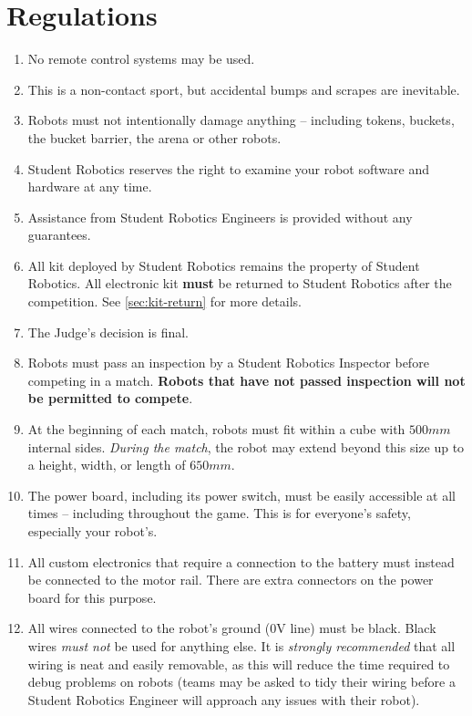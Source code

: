 \section {Regulations}
\label{sec:Regulations}

\begin{enumerate}


\item No remote control systems may be used.
\item This is a non-contact sport, but accidental bumps and scrapes are inevitable.
\item Robots must not intentionally damage anything -- including tokens, buckets, the bucket barrier, the arena or other robots.
\item Student Robotics reserves the right to examine your robot software and hardware at any time.
\item Assistance from Student Robotics Engineers is provided without any guarantees.
\item All kit deployed by Student Robotics remains the property of Student Robotics.
 All electronic kit \textbf{must} be returned to Student Robotics after the competition. See \autoref{sec:kit-return} for more details.
\item The Judge's decision is final.


\item Robots must pass an inspection by a Student Robotics Inspector before competing in a match.
 \textbf{Robots that have not passed inspection will not be permitted to compete}.

\item At the beginning of each match, robots must fit within a cube with $500mm$ internal sides.  \textit{During the match}, the robot may extend beyond this size up to a height, width, or length of $650mm$.

\item The power board, including its power switch, must be easily accessible at all times -- including throughout the game.  This is for everyone's safety, especially your robot's.

\item All custom electronics that require a connection to the battery must instead be connected to the motor rail.
 There are extra connectors on the power board for this purpose.

\item All wires connected to the robot's ground (0V line) must be black.
 Black wires \emph{must not} be used for anything else.
 It is \emph{strongly recommended} that all wiring is neat and easily removable, as this will reduce the time required to debug problems on robots
  (teams may be asked to tidy their wiring before a Student Robotics Engineer will approach any issues with their robot).


\end{enumerate}
